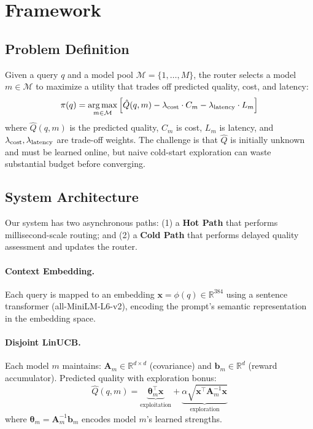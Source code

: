 
\section{Framework}
\label{sec:method}

\subsection{Problem Definition}
\label{sec:problem}

Given a query $q$ and a model pool $\mathcal{M}=\{1,\ldots,M\}$, the router selects a model $m\in\mathcal{M}$ to maximize a utility that trades off predicted quality, cost, and latency:
\begin{equation}
\pi(q) = \operatorname*{arg\,max}_{m \in \mathcal{M}} \left[ \hat{Q}(q, m) - \lambda_{\text{cost}} \cdot C_m - \lambda_{\text{latency}} \cdot L_m \right]
\label{eq:utility}
\end{equation}
where $\hat{Q}(q, m)$ is the predicted quality, $C_m$ is cost, $L_m$ is latency, and $\lambda_{\text{cost}},\lambda_{\text{latency}}$ are trade-off weights. The challenge is that $\hat{Q}$ is initially unknown and must be learned online, but naive cold-start exploration can waste substantial budget before converging.

\subsection{System Architecture}
\label{sec:architecture}

Our system has two asynchronous paths: (1) a \textbf{Hot Path} that performs millisecond-scale routing; and (2) a \textbf{Cold Path} that performs delayed quality assessment and updates the router.

\paragraph{Context Embedding.} Each query is mapped to an embedding $\mathbf{x}=\phi(q)\in\mathbb{R}^{384}$ using a sentence transformer (all-MiniLM-L6-v2), encoding the prompt's semantic representation in the embedding space.

\paragraph{Disjoint LinUCB.} Each model $m$ maintains: $\mathbf{A}_m \in \mathbb{R}^{d \times d}$ (covariance) and $\mathbf{b}_m \in \mathbb{R}^{d}$ (reward accumulator). Predicted quality with exploration bonus:
\begin{equation}
\hat{Q}(q, m) = \underbrace{\boldsymbol{\theta}_m^\top \mathbf{x}}_{\text{exploitation}} + \underbrace{\alpha \sqrt{\mathbf{x}^\top \mathbf{A}_m^{-1} \mathbf{x}}}_{\text{exploration}}
\label{eq:ucb}
\end{equation}
where $\boldsymbol{\theta}_m = \mathbf{A}_m^{-1} \mathbf{b}_m$ encodes model $m$'s learned strengths.

